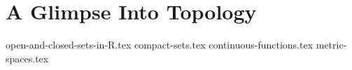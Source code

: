 \chapter{A Glimpse Into Topology}
{open-and-closed-sets-in-R.tex}
{compact-sets.tex}
{continuous-functions.tex}
{metric-spaces.tex}
